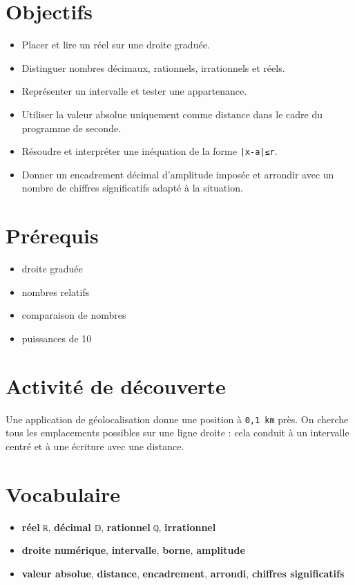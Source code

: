 \section{Objectifs}

\begin{itemize}
\item Placer et lire un réel sur une droite graduée.
\item Distinguer nombres décimaux, rationnels, irrationnels et réels.
\item Représenter un intervalle et tester une appartenance.
\item Utiliser la valeur absolue uniquement comme distance dans le cadre du programme de seconde.
\item Résoudre et interpréter une inéquation de la forme \texttt{|x-a|≤r}.
\item Donner un encadrement décimal d'amplitude imposée et arrondir avec un nombre de chiffres significatifs adapté à la situation.
\end{itemize}

\section{Prérequis}

\begin{itemize}
\item droite graduée
\item nombres relatifs
\item comparaison de nombres
\item puissances de 10
\end{itemize}

\section{Activité de découverte}

Une application de géolocalisation donne une position à \texttt{0,1 km} près. On cherche tous les emplacements possibles sur une ligne droite : cela conduit à un intervalle centré et à une écriture avec une distance.

\section{Vocabulaire}

\begin{itemize}
\item \textbf{réel} \texttt{ℝ}, \textbf{décimal} \texttt{𝔻}, \textbf{rationnel} \texttt{ℚ}, \textbf{irrationnel}
\item \textbf{droite numérique}, \textbf{intervalle}, \textbf{borne}, \textbf{amplitude}
\item \textbf{valeur absolue}, \textbf{distance}, \textbf{encadrement}, \textbf{arrondi}, \textbf{chiffres significatifs}
\end{itemize}


